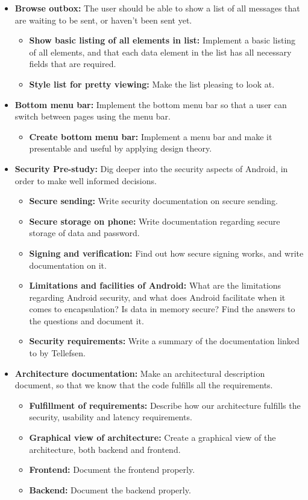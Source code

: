\begin{itemize}
\begin{itemize}
\end{itemize}
\item{}\textbf{Browse outbox:} The user should be able to show a list of all messages that are waiting to be sent, or haven’t been sent yet.
\begin{itemize}
\item{}\textbf{Show basic listing of all elements in list:} Implement a basic listing of all elements, and that each data element in the list has all necessary fields that are required.
\item{}\textbf{Style list for pretty viewing:} Make the list pleasing to look at.
\end{itemize}
\item{}\textbf{Bottom menu bar:} Implement the bottom menu bar so that a user can switch between pages using the menu bar.
\begin{itemize}
\item{}\textbf{Create bottom menu bar:} Implement a menu bar and make it presentable and useful by applying design theory.
\end{itemize}

\newpage

\item{}\textbf{Security Pre-study:} Dig deeper into the security aspects of Android, in order to make well informed decisions.
\begin{itemize}
\item{}\textbf{Secure sending:} Write security documentation on secure sending.
\item{}\textbf{Secure storage on phone:} Write documentation regarding secure storage of data and password.
\item{}\textbf{Signing and verification:} Find out how secure signing works, and write documentation on it.
\item{}\textbf{Limitations and facilities of Android:} What are the limitations regarding Android security, and what does Android facilitate when it comes to encapsulation? Is data in memory secure? Find the answers to the questions and document it.
\item{}\textbf{Security requirements:} Write a summary of the documentation linked to by Tellefsen.
\end{itemize}
\item{}\textbf{Architecture documentation:} Make an architectural description document, so that we know that the code fulfills all the requirements.
\begin{itemize}
\item{}\textbf{Fulfillment of requirements:} Describe how our architecture fulfills the security, usability and latency requirements.
\item{}\textbf{Graphical view of architecture:} Create a graphical view of the architecture, both backend and frontend.
\item{}\textbf{Frontend:} Document the frontend properly.
\item{}\textbf{Backend:} Document the backend properly.
\end{itemize}
\end{itemize}
